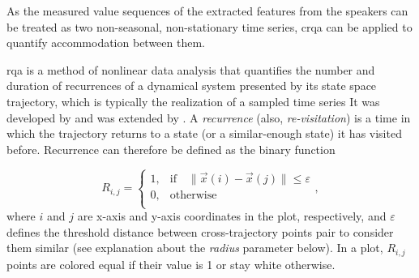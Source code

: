 As the measured value sequences of the extracted features from the speakers can be treated as two non-seasonal, non-stationary time series, \acf{crqa} can be applied to quantify accommodation between them.

\Ac{rqa} is a method of nonlinear data analysis that quantifies the number and duration of recurrences of a dynamical system presented by its state space trajectory, which is typically the realization of a sampled time series
It was developed by \citet{Zbilut1992embeddings} and was extended by \citet{Webber2005recurrence,Marwan2002cross}.
A \emph{recurrence} (also, \emph{re-visitation}) is a time in which the trajectory returns to a state (or a similar-enough state) it has visited before.
Recurrence can therefore be defined as the binary function

\begin{equation}
	\label{eq:recurrence}
	R_{i,j} =
	\begin{cases}
		1,	&	\text{if} \quad \lVert \vec{x}(i)-\vec{x}(j) \rVert \leq \varepsilon \\
		0,	&	\text{otherwise} \\
	\end{cases},
\end{equation}
%
where $i$ and $j$ are x-axis and y-axis coordinates in the plot, respectively, and $\varepsilon$ defines the threshold distance between cross-trajectory points pair to consider them similar (see explanation about the \emph{radius} parameter below).
In a plot, $R_{i,j}$ points are colored equal if their value is 1 or stay white otherwise.

